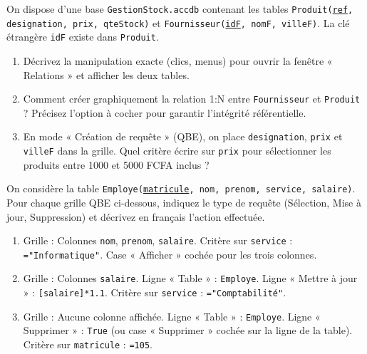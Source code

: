 \documentclass[11pt]{article}
\begin{document}
\begin{exercice}
On dispose d'une base \texttt{GestionStock.accdb} contenant les tables \texttt{Produit(\underline{ref}, designation, prix, qteStock)} et \texttt{Fournisseur(\underline{idF}, nomF, villeF)}. La clé étrangère \texttt{idF} existe dans \texttt{Produit}.
\begin{enumerate}
    \item Décrivez la manipulation exacte (clics, menus) pour ouvrir la fenêtre « Relations » et afficher les deux tables.
    \item Comment créer graphiquement la relation 1:N entre \texttt{Fournisseur} et \texttt{Produit} ? Précisez l'option à cocher pour garantir l'intégrité référentielle.
    \item En mode « Création de requête » (QBE), on place \texttt{designation}, \texttt{prix} et \texttt{villeF} dans la grille. Quel critère écrire sur \texttt{prix} pour sélectionner les produits entre 1000 et 5000 FCFA inclus ?
\end{enumerate}
\end{exercice}

\begin{exercice}
On considère la table \texttt{Employe(\underline{matricule}, nom, prenom, service, salaire)}. Pour chaque grille QBE ci-dessous, indiquez le type de requête (Sélection, Mise à jour, Suppression) et décrivez en français l'action effectuée.

\begin{enumerate}
    \item Grille : Colonnes \texttt{nom}, \texttt{prenom}, \texttt{salaire}. Critère sur \texttt{service} : \texttt{="Informatique"}. Case « Afficher » cochée pour les trois colonnes.
    \item Grille : Colonnes \texttt{salaire}. Ligne « Table » : \texttt{Employe}. Ligne « Mettre à jour » : \texttt{[salaire]*1.1}. Critère sur \texttt{service} : \texttt{="Comptabilité"}.
    \item Grille : Aucune colonne affichée. Ligne « Table » : \texttt{Employe}. Ligne « Supprimer » : \texttt{True} (ou case « Supprimer » cochée sur la ligne de la table). Critère sur \texttt{matricule} : \texttt{=105}.
\end{enumerate}
\end{exercice}
\end{document}
